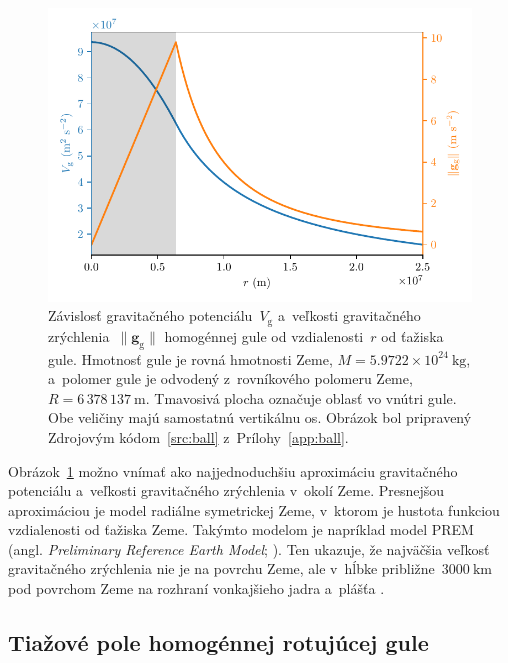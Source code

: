 \documentclass[a4paper, 12pt]{book}
\newcommand{\gidx}{\mathrm g}
\let\vec\mathbf
\begin{document}
\begin{figure}[bt]
\centering
\includegraphics{./fig-homogeneous-ball-vg-gg.pdf}
\caption{Závislosť gravitačného potenciálu~$V_\gidx$ a~veľkosti gravitačného 
zrýchlenia~$\| \vec g_\gidx \|$ homogénnej gule od vzdialenosti~$r$ od ťažiska 
gule.  Hmotnosť gule je rovná hmotnosti Zeme, $M = 5.9722 \times 10^{24} 
\ \mathrm{kg}$, a~polomer gule je odvodený z~rovníkového polomeru Zeme, $R 
= 6\,378\,137\ \mathrm{m}$.  Tmavosivá plocha označuje oblasť vo vnútri gule.  
Obe veličiny majú samostatnú vertikálnu os.  Obrázok bol pripravený Zdrojovým 
kódom~\ref{src:ball} z~Prílohy~\ref{app:ball}.}
\label{fig:homogeneous_ball_plot}
\end{figure}

Obrázok~\ref{fig:homogeneous_ball_plot} možno vnímať ako najjednoduchšiu 
aproximáciu gravitačného potenciálu a~veľkosti gravitačného zrýchlenia v~okolí 
Zeme.  Presnejšou aproximáciou je model radiálne symetrickej Zeme, v~ktorom je 
hustota funkciou vzdialenosti od ťažiska Zeme.  Takýmto modelom je napríklad 
model PREM (angl. \emph{Preliminary Reference Earth Model}; 
\cite{Dziewonski1981}).  Ten ukazuje, že najväčšia veľkosť gravitačného 
zrýchlenia nie je na povrchu Zeme, ale v~hĺbke približne~$3000\ \mathrm{km}$ 
pod povrchom Zeme na rozhraní vonkajšieho jadra a~plášťa \parencite[pozri 
napríklad][]{TorgeGeodesy,Lowrie2007}.

\subsection{Tiažové pole homogénnej rotujúcej gule}
\label{sec:homogeneous_ball_gravity_field}
\end{document}
